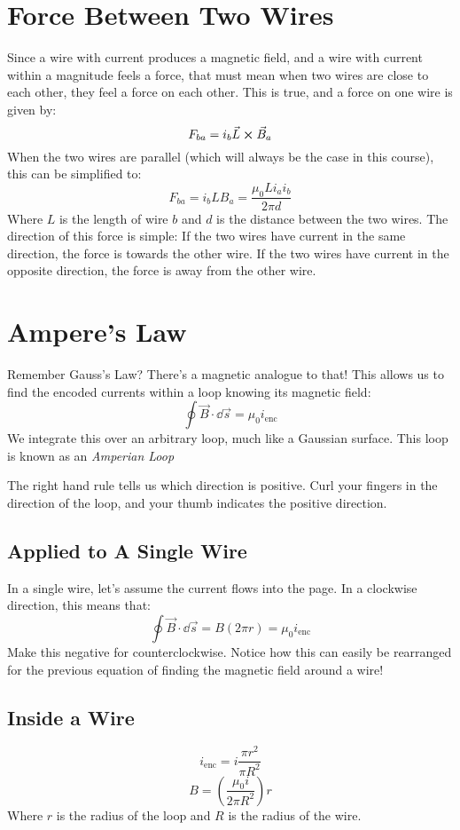 \documentclass[]{article}
\begin{document}
\section{Force Between Two Wires}
Since a wire with current produces a magnetic field, and a wire with current within a magnitude feels a force, that must mean when two wires are close to each other, they feel a force on each other. This is true, and a force on one wire is given by:
\[ F_{ba} = i_b \vec{L} \cross \vec{B}_a \]
When the two wires are parallel (which will always be the case in this course), this can be simplified to:
\[ F_{ba} = i_b L B_a = \frac{\mu_0 L i_a i_b}{2 \pi d} \]
Where $ L $ is the length of wire $ b $ and $ d $ is the distance between the two wires. The direction of this force is simple: If the two wires have current in the same direction, the force is towards the other wire. If the two wires have current in the opposite direction, the force is away from the other wire.

\section{Ampere's Law}
Remember Gauss's Law? There's a magnetic analogue to that! This allows us to find the encoded currents within a loop knowing its magnetic field:
\[ \oint \vec{B} \cdot \dd \vec{s} = \mu_0 i_{\text{enc}} \]
We integrate this over an arbitrary loop, much like a Gaussian surface. This loop is known as an \emph{Amperian Loop}

The right hand rule tells us which direction is positive. Curl your fingers in the direction of the loop, and your thumb indicates the positive direction.

\subsection{Applied to A Single Wire}
In a single wire, let's assume the current flows into the page. In a clockwise direction, this means that:
\[ \oint \vec{B} \cdot \dd \vec{s} = B(2\pi r) = \mu_0 i_{\text{enc}} \]
Make this negative for counterclockwise. Notice how this can easily be rearranged for the previous equation of finding the magnetic field around a wire!

\subsection{Inside a Wire}
\[ i_{\text{enc}} = i \frac{\pi r^2}{\pi R^2} \]
\[ B = \left(\frac{\mu_0 i}{2 \pi R^2}\right)r \]
Where $ r $ is the radius of the loop and $ R $ is the radius of the wire.
\end{document}
